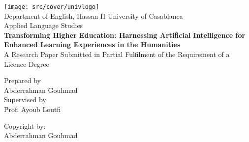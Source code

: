 \begin{titlepage}
  \centering
  \texttt{[image: src/cover/univlogo]} \\
  \centering
  Department of English, Hassan II University of Casablanca \\
  Applied Language Studies \\
  \vspace*{2cm}
  \textbf{\huge Transforming Higher Education: Harnessing Artificial Intelligence for Enhanced Learning Experiences in the Humanities} \\
  \vspace*{2cm}
  A Research Paper Submitted in Partial Fulfilment of the Requirement of a Licence Degree \\
  \vspace*{3.5cm}

  \begin{center}
    Prepared by\\ Abderrahman
    Gouhmad\\ Supervised by \\
    Prof. Ayoub Loutfi \\
  \end{center}
  \newpage
  \thispagestyle{empty}
  \vspace*{20cm}
  Copyright by:\\
  Abderrahman Gouhmad \\
  \vspace*{\fill}
  \mydate
\end{titlepage}
